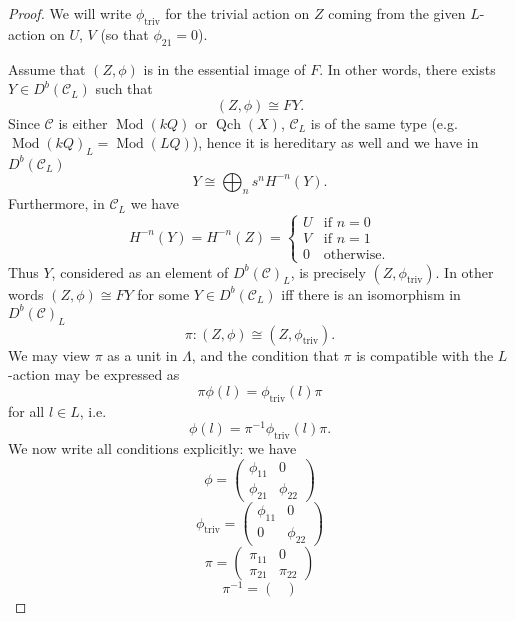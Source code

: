 \documentclass{amsart}
\numberwithin{equation}{section}
\let\cal\mathcal
\theoremstyle{definition}
\theoremstyle{remark}
\begin{document}
\begin{proof}
We will write $\phi_{\operatorname{triv}}$ for the trivial action on $Z$ coming 
from the given $L$-action on $U$, $V$ (so that $\phi_{21}=0$).

Assume that $(Z,\phi)$ is in the essential image of $F$. In other words, there exists $Y\in D^b({{\cal C}}_L)$
such that 
\begin{equation}
\label{ref-6.1-36}
(Z,\phi)\cong FY.
\end{equation}
Since ${{\cal C}}$ is either ${\operatorname{Mod}}(kQ)$ or ${\operatorname{Qch}}(X)$, ${{\cal C}}_L$ is of the same type (e.g. ${\operatorname{Mod}}(kQ)_L={\operatorname{Mod}}(LQ)$), hence it is hereditary as well and we have in $D^b({{\cal C}}_L)$
\[
Y\cong \bigoplus_n s^nH^{-n}(Y).
\]
Furthermore, in ${{\cal C}}_L$ we have 
\[
H^{-n}(Y)=H^{-n}(Z)=
\begin{cases}
U&\text{if $n=0$}\\
V&\text{if $n=1$}\\
0&\text{otherwise}.
\end{cases}
\]
Thus $Y$, considered as an element of $D^b({{\cal C}})_L$, is precisely $(Z,\phi_{\operatorname{triv}})$.
In other words $(Z,\phi)\cong FY$ for some $Y\in D^b({{\cal C}}_L)$ iff there is an
isomorphism in $D^b({{\cal C}})_L$
\begin{equation}
\label{ref-6.2-37}
\pi:(Z,\phi)\cong (Z,\phi_{\operatorname{triv}}).
\end{equation}
We may view $\pi$ as a unit in $\Lambda$, and the condition that
$\pi$ is compatible with the $L$-action may be expressed as 
\[
\pi\phi(l)=\phi_{\operatorname{triv}}(l)\pi
\]
for all $l\in L$, i.e.
\begin{equation}
\label{ref-6.3-38}
\phi(l)=\pi^{-1}\phi_{\operatorname{triv}}(l)\pi.
\end{equation}
We now write all conditions explicitly: we have
\[
\phi=\begin{pmatrix}
\phi_{11}&0\\
\phi_{21}&\phi_{22}
\end{pmatrix}
\]
\[
\phi_{\operatorname{triv}}=\begin{pmatrix}
\phi_{11}&0\\
0&\phi_{22}
\end{pmatrix}
\]
\[
\pi
=
\begin{pmatrix}
\pi_{11}&0\\
\pi_{21}&\pi_{22}
\end{pmatrix}
\]
\[
\pi^{-1}
=
\begin{pmatrix}

\end{pmatrix}\]
\end{proof}
\end{document}
